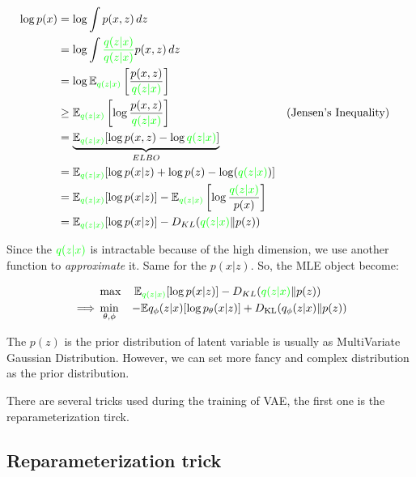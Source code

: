 \documentclass[
  12pt,
]{article}
\theoremstyle{plain}
\theoremstyle{remark}
\begin{document}
\[
\begin{split}\log p(x) &= \log \int p(x, z) \, dz \\&= \log  \int \textcolor{green}{\frac{q(z|x)}{q(z|x)}} p(x, z) \, dz  \\&=  \log \mathbb{E}_{\textcolor{green}{q(z|x)}}\left[ \frac{p(x,z)}{\textcolor{green}{q(z|x)}} \right] \\ &\geq  \mathbb{E}_{\textcolor{green}{q(z|x)}}\left[ \log \frac{p(x,z)}{\textcolor{green}{q(z|x)}} \right]  && \text{(Jensen's Inequality)}\\ & =\underbrace{ \mathbb{E}_{\textcolor{green}{q(z|x)}}[\log p(x, z) -  \log\textcolor{green}{q(z|x)}] }_{ ELBO } \\&=  \mathbb{E}_{\textcolor{green}{q(z|x)}}[\log p(x |z) +\log p(z) - \log (\textcolor{green}{q(z |x)})] \\ &=  \mathbb{E}_{\textcolor{green}{q(z|x)}}[\log p(x|z)]   - \mathbb{E}_{\textcolor{green}{q(z|x)}}\left[ \log \frac{\textcolor{green}{q(z|x)}}{p(x)} \right] \\ &=  \mathbb{E}_{\textcolor{green}{q(z|x)}}[\log p(x|z)]  - D_{KL}(\textcolor{green}{q(z |x)} \| p(z)  ) \\\end{split}
\]

Since the \(\textcolor{green}{q(z|x)}\) is intractable because of the
high dimension, we use another function to \emph{approximate} it. Same
for the \(p(x | z)\). So, the MLE object become:

\[
\begin{align} &\max \quad  \mathbb{E}_{\textcolor{green}{q(z|x)}}[\log p(x|z)]  - D_{KL}(\textcolor{green}{q(z |x)} \| p(z)  )  \\  \implies &\min_{\theta,\phi} \quad -\mathbb{E}{q_{\phi}(z|x)}[\log p_{\theta}(x|z)] + D_{\text{KL}}(q_{\phi}(z|x)\|p(z))\end{align}
\]

The \(p(z)\) is the prior distribution of latent variable is usually as
MultiVariate Gaussian Distribution. However, we can set more fancy and
complex distribution as the prior distribution.

There are several tricks used during the training of VAE, the first one
is the reparameterization tirck.

\subsection{Reparameterization trick}\label{reparameterization-trick}
\end{document}
